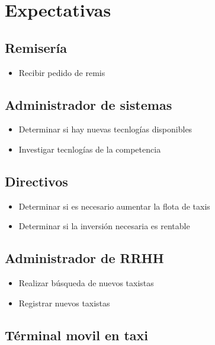 \documentclass[a4paper]{article}
\begin{document}
\section{Expectativas}

\subsection{Remiser\'ia}
\begin{itemize}
 \item Recibir pedido de remis
\end{itemize}

\subsection{Administrador de sistemas}
\begin{itemize}
 \item Determinar si hay nuevas tecnlog\'ias disponibles
 \item Investigar tecnlog\'ias de la competencia
 
\end{itemize}



\subsection{Directivos}

\begin{itemize}
 \item Determinar si es necesario aumentar la flota de taxis
 \item Determinar si la inversi\'on necesaria es rentable
\end{itemize}

\subsection{Administrador de RRHH}

\begin{itemize}
 \item Realizar b\'usqueda de nuevos taxistas
 \item Registrar nuevos taxistas
\end{itemize}


\subsection{T\'erminal movil en taxi}
\end{document}
